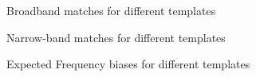 \documentclass[showpacs, superscriptaddress, showpacs, letterpaper, showkeys,
preprintnumbers, altaffilletter, amssymb, amsmath, amsfonts, prd,
onecolumn, floatfix, nofootinbib]{revtex4-1}
\begin{document}
\begin{figure}
\caption{Broadband matches for different templates}
\end{figure}

\begin{figure}
\caption{Narrow-band matches for different templates}
\end{figure}

\begin{figure}
\caption{Expected Frequency biases for different templates}
\end{figure}
\end{document}
